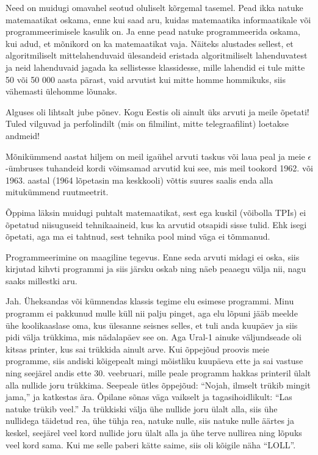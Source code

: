 Need on muidugi omavahel seotud oluliselt kõrgemal tasemel. Pead ikka natuke matemaatikat oskama, enne kui saad aru, kuidas matemaatika informaatikale või programmeerimisele kasulik on. Ja 
enne pead natuke programmeerida oskama, kui adud, et mõnikord on ka
matemaatikat vaja. Näiteks alustades sellest, et algoritmiliselt 
mittelahenduvaid ülesandeid eristada algoritmiliselt lahenduvatest ja neid 
lahenduvaid jagada ka sellistesse klassidesse, mille lahendid ei tule mitte 50 
või 50 000 aasta pärast, vaid arvutist kui mitte homme 
hommikuks, siis vähemasti ülehomme lõunaks.


Alguses oli lihtsalt jube põnev. Kogu Eestis oli ainult üks arvuti ja meile 
õpetati! Tuled vilguvad ja perfolindilt (mis on filmilint, mitte 
telegraafilint) loetakse andmeid! 

Mõnikümmend aastat hiljem on meil igaühel arvuti taskus või laua peal ja meie $\epsilon$-ümbruses tuhandeid kordi võimsamad arvutid kui see, mis meil tookord 1962. või 1963. aastal (1964 lõpetasin ma keskkooli) võttis suures 
saalis enda alla mitukümmend ruutmeetrit. 

Õppima läksin muidugi puhtalt matemaatikat, sest ega kuskil (võibolla TPIs) ei õpetatud niisuguseid 
tehnikaaineid, kus ka arvutid otsapidi sisse tulid. Ehk isegi õpetati, aga ma 
ei tahtnud, sest tehnika pool mind väga ei tõmmanud. 

Programmeerimine on maagiline tegevus. Enne 
seda arvuti midagi ei oska, siis kirjutad kihvti programmi ja 
siis järsku oskab ning näeb peaaegu välja nii, nagu saaks 
millestki aru. 


Jah. Üheksandas või kümnendas klassis tegime elu esimese 
programmi. Minu programm ei pakkunud mulle küll nii palju pinget, aga elu lõpuni 
jääb meelde ühe koolikaaslase oma, kus ülesanne seisnes selles, 
et tuli anda kuupäev ja siis pidi välja trükkima, mis nädalapäev see on. Aga 
Ural-1 ainuke väljundseade oli 
kitsas printer, kus sai trükkida ainult arve. Kui õppejõud proovis 
meie programme, siis andiski kõigepealt mingi mõistliku kuupäeva ette ja sai 
vastuse ning seejärel andis ette 30. veebruari, mille peale programm hakkas 
printeril ülalt alla nullide joru trükkima. Seepeale ütles õppejõud: 
\enquote{Nojah, ilmselt trükib mingit jama,} ja katkestas ära. 
Õpilane sõnas väga vaikselt ja tagasihoidlikult: \enquote{Las natuke trükib veel.} Ja trükkiski välja ühe nullide joru ülalt alla, siis ühe 
nullidega täidetud rea, ühe tühja rea, natuke nulle, siis natuke 
nulle äärtes ja keskel, seejärel veel kord nullide joru 
ülalt alla ja ühe terve nullirea ning lõpuks veel kord sama. Kui me selle 
paberi kätte saime, siis oli kõigile näha \enquote{LOLL}. 

